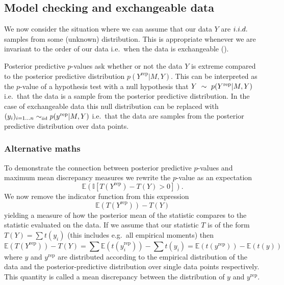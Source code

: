 \documentclass{article} %
\def\ie{i.e.\ }
\def\eg{e.g.\ }
\begin{document}
\subsection{Model checking and exchangeable data}

We now consider the situation where we can assume that our data $Y$ are $i.i.d.\ $ samples from some (unknown) distribution.
This is appropriate whenever we are invariant to the order of our data \ie when the data is exchangeable ().

Posterior predictive $p$-values ask whether or not the data $Y$ is extreme compared to the posterior predictive distribution $p(Y^\textrm{rep}|M,Y)$.
This can be interpreted as the $p$-value of a hypothesis test with a null hypothesis that ${Y \ \sim\  p(Y^\textrm{rep}|M,Y)}$ \ie that the data is a sample from the posterior predictive distribution.
In the case of exchangeable data this null distribution can be replaced with ${(y_i)_{i=1\ldots n} \simiid p(y^\textrm{rep}|M,Y)}$ \ie that the data are \iid samples from the posterior predictive distribution over data points.

\subsubsection{Alternative maths}


To demonstrate the connection between posterior predictive $p$-values and maximum mean discrepancy measures we rewrite the $p$-value as an expectation
\begin{equation}
\mathbb{E}(\mathbb{I}[T(Y^\textrm{rep}) - T(Y) > 0]).
\end{equation}
We now remove the indicator function from this expression
\begin{equation}
  \mathbb{E}(T(Y^\textrm{rep})) - T(Y)
\end{equation}
yielding a measure of how the posterior mean of the statistic compares to the statistic evaluated on the data.
If we assume that our statistic $T$ is of the form $T(Y) = \sum t(y_i)$ (this includes \eg all empirical moments) then
\begin{equation}
\mathbb{E}(T(Y^\textrm{rep})) - T(Y) = \sum \mathbb{E}(t(y_i^\textrm{rep})) - \sum t(y_i) = \mathbb{E}(t(y^\textrm{rep})) - \mathbb{E}(t(y))
\end{equation}
where $y$ and $y^\textrm{rep}$ are distributed according to the empirical distribution of the data and the posterior-predictive distribution over single data points respectively.
This quantity is called a mean discrepancy between the distribution of $y$ and $y^\textrm{rep}$.
\end{document}
